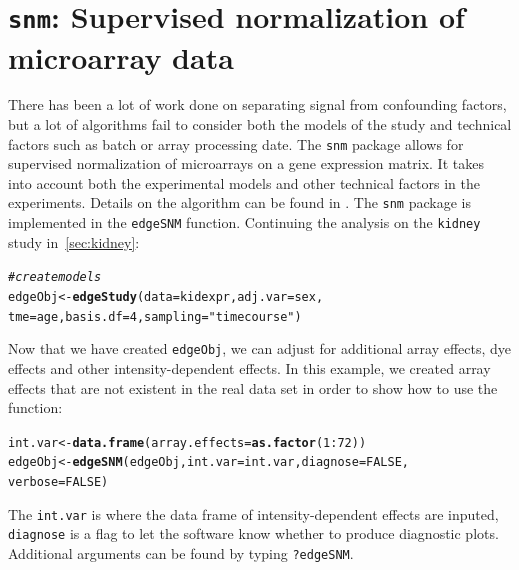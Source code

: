 \documentclass{article}\usepackage[]{graphicx}\usepackage[]{color}
\makeatletter
\newcommand{\hlnum}[1]{\textcolor[rgb]{0.686,0.059,0.569}{#1}}%
\newcommand{\hlstr}[1]{\textcolor[rgb]{0.192,0.494,0.8}{#1}}%
\newcommand{\hlcom}[1]{\textcolor[rgb]{0.678,0.584,0.686}{\textit{#1}}}%
\newcommand{\hlopt}[1]{\textcolor[rgb]{0,0,0}{#1}}%
\newcommand{\hlstd}[1]{\textcolor[rgb]{0.345,0.345,0.345}{#1}}%
\newcommand{\hlkwb}[1]{\textcolor[rgb]{0.69,0.353,0.396}{#1}}%
\newcommand{\hlkwc}[1]{\textcolor[rgb]{0.333,0.667,0.333}{#1}}%
\newcommand{\hlkwd}[1]{\textcolor[rgb]{0.737,0.353,0.396}{\textbf{#1}}}%
\newenvironment{kframe}{%
 \def\at@end@of@kframe{}%
 \ifinner\ifhmode%
  \def\at@end@of@kframe{\end{minipage}}%
  \begin{minipage}{\columnwidth}%
 \fi\fi%
 \def\FrameCommand##1{\hskip\@totalleftmargin \hskip-\fboxsep
 \colorbox{shadecolor}{##1}\hskip-\fboxsep
     \hskip-\linewidth \hskip-\@totalleftmargin \hskip\columnwidth}%
 \MakeFramed {\advance\hsize-\width
   \@totalleftmargin\z@ \linewidth\hsize
   \@setminipage}}%
 {\par\unskip\endMakeFramed%
 \at@end@of@kframe}
\newenvironment{knitrout}{}{} %
\makeatother
\begin{document}
\section{{\tt snm}: Supervised normalization of microarray data}
There has been a lot of work done on separating signal from confounding factors, but a lot of algorithms fail to consider both the models of the study and technical factors such as batch or array processing date. The {\tt snm} package allows for supervised normalization of microarrays on a gene expression matrix. It takes into account both the experimental models and other technical factors in the experiments. Details on the algorithm can be found in \cite{mecham:2010}. The {\tt snm} package is implemented in the {\tt edgeSNM} function. Continuing the analysis on the {\tt kidney} study in~\ref{sec:kidney}:
\begin{knitrout}
\color{fgcolor}\begin{kframe}
\begin{alltt}
\hlcom{# create models}
\hlstd{edgeObj} \hlkwb{<-} \hlkwd{edgeStudy}\hlstd{(}\hlkwc{data} \hlstd{= kidexpr,} \hlkwc{adj.var} \hlstd{= sex,}
    \hlkwc{tme} \hlstd{= age,} \hlkwc{basis.df} \hlstd{=} \hlnum{4}\hlstd{,} \hlkwc{sampling} \hlstd{=} \hlstr{"timecourse"}\hlstd{)}
\end{alltt}
\end{kframe}
\end{knitrout}
Now that we have created {\tt edgeObj}, we can adjust for additional array effects, dye effects and other intensity-dependent effects.  In this example, we created array effects that are not existent in the real data set in order to show how to use the function:
\begin{knitrout}
\color{fgcolor}\begin{kframe}
\begin{alltt}
\hlstd{int.var} \hlkwb{<-} \hlkwd{data.frame}\hlstd{(}\hlkwc{array.effects} \hlstd{=} \hlkwd{as.factor}\hlstd{(}\hlnum{1}\hlopt{:}\hlnum{72}\hlstd{))}
\hlstd{edgeObj} \hlkwb{<-} \hlkwd{edgeSNM}\hlstd{(edgeObj,} \hlkwc{int.var} \hlstd{= int.var,} \hlkwc{diagnose} \hlstd{=} \hlnum{FALSE}\hlstd{,}
    \hlkwc{verbose} \hlstd{=} \hlnum{FALSE}\hlstd{)}
\end{alltt}
\end{kframe}
\end{knitrout}
The {\tt int.var} is where the data frame of intensity-dependent effects are inputed, {\tt diagnose} is a flag to let the software know whether to produce diagnostic plots. Additional arguments can be found by typing {\tt ?edgeSNM}.
\end{document}
